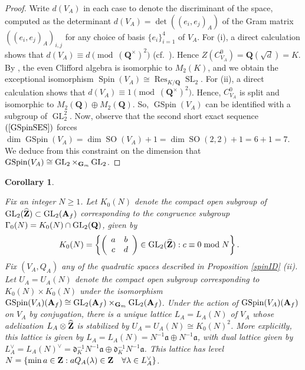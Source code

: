 \documentclass{amsart}
\newtheorem{corollary}[theorem]{Corollary}
\theoremstyle{definition}
\begin{document}
\begin{proof} Write $d(V_A)$ in each case to denote the discriminant of the space, computed as the determinant 
$d(V_A) = \det((e_i, e_j)_A)$ of the Gram matrix $((e_i, e_j)_A)_{i, j}$ for any choice of basis $\lbrace e_i \rbrace_{i=1}^4$ of $V_A$. 
For (i), a direct calculation shows that $d(V_A) \equiv d \pmod{(\mathbf{Q}^\times)^2}$ (cf.~\cite[$\S$2.7]{Br}).
Hence $Z(C_{V_A}^0) = \mathbf{Q}(\sqrt d)=K$. By \cite[$\S$ 2.7]{Br}, the even Clifford algebra is isomorphic to $M_2(K)$,
and we obtain the exceptional isomorphism $\operatorname{Spin}(V_A) \cong \operatorname{Res}_{K/\mathbf Q} \operatorname{SL}_2.$
For (ii), a direct calculation shows that $d(V_A) \equiv 1 \pmod{(\mathbf{Q}^\times)^2}$.
Hence, $C_{V_A}^0$ is split and isomorphic to $M_2(\mathbf Q) \oplus M_2(\mathbf Q)$. 
So, $\operatorname{GSpin}(V_A)$ can be identified with a subgroup of $\operatorname{GL}_2^2$.
Now, observe that the second short exact sequence $(\ref{GSpinSES})$ forces 
$\dim \operatorname{GSpin}(V_A) = \dim \operatorname{SO}(V_A) + 1 = \dim \operatorname{SO}(2,2)+1 = 6+1=7$.
We deduce from this constraint on the dimension that $\operatorname{GSpin}(V_A) \cong  \operatorname{GL}_2 \times_{{\bf{G}}_m} \operatorname{GL}_2$. \end{proof}

\begin{corollary}\label{lattices} 

Fix an integer $N \geq 1$. Let $K_0(N)$ denote the compact open subgroup of 
$\operatorname{GL}_2(\widehat{\bf{Z}}) \subset \operatorname{GL}_2({\bf{A}}_f)$ corresponding to the 
congruence subgroup $\Gamma_0(N) = K_0(N) \cap \operatorname{GL}_2({\bf{Q}})$, given by 
\begin{align*} K_0(N) &= \left\lbrace \left( \begin{array}{cc} a & b \\ c & d\end{array} \right) 
\in \operatorname{GL}_2(\widehat{\bf{Z}}) : c \equiv 0 \bmod N \right\rbrace. \end{align*}
Fix $(V_A, Q_A)$ any of the quadratic spaces described in Proposition \ref{spinID} (ii).
Let $U_A =  U_A(N)$ denote the compact open subgroup corresponding to $K_0(N) \times K_0(N)$
under the isomorphism $\operatorname{GSpin}(V_A)({\bf{A}}_f) \cong \operatorname{GL}_2({\bf{A}}_f) \times_{{\bf{G}}_m} \operatorname{GL}_2({\bf{A}}_f)$.
Under the action of $\operatorname{GSpin}(V_A)({\bf{A}}_f)$ on $V_A$ by conjugation, there is a unique lattice $L_A = L_A(N)$ of $V_A$ whose adelization 
$L_A \otimes \widehat{{\bf{Z}}}$ is stabilized by $U_A = U_A(N) \cong K_0(N)^2$.
More explicitly, this lattice is given by $L_A = L_A(N) = N^{-1} \mathfrak{a} \oplus N^{-1} \mathfrak{a}$, with dual lattice
given by $L_A^{\vee} = L_A(N)^{\vee} = \mathfrak{d}_K^{-1} N^{-1} \mathfrak{a} \oplus \mathfrak{d}_K^{-1} N^{-1} \mathfrak{a}$. 
This lattice has level $N = \lbrace \min a \in {\bf{Z}} : a Q_A(\lambda) \in {\bf{Z}} \quad \forall \lambda \in L_A^{\vee} \rbrace$. \end{corollary}
\end{document}
